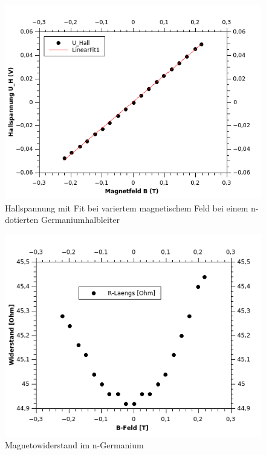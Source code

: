 \documentclass[12pt,a4paper]{article}
\begin{document}
\begin{multicols}{2}



\end{multicols}
\begin{figure}[H]
	\centering
	\includegraphics[scale=1.5]{./figures/Hall_nGe_UH-B.png}
	\caption{Hallspannung mit Fit bei variertem magnetischem Feld bei einem n-dotierten Germaniumhalbleiter}
	\label{fig:nGe_UH_B}
\end{figure}
\begin{figure}[H]
	\centering
	\includegraphics[scale=1.2]{./figures/Hall_nGe_magnetischer_Widerstand.png}
	\caption{Magnetowiderstand im n-Germanium}
	\label{fig:nGe_mag_wider}
\end{figure}
\end{document}
